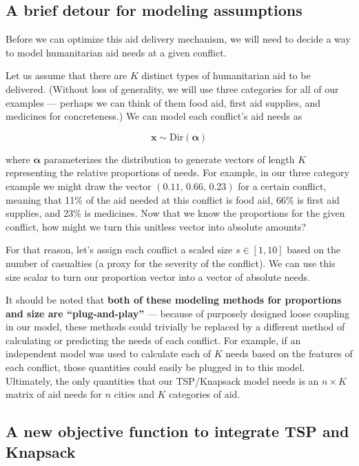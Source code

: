 \documentclass{article} %
\begin{document}
\subsection{A brief detour for modeling assumptions}

Before we can optimize this aid delivery mechanism, we will need to decide a way to model humanitarian aid needs at a given conflict.

Let us assume that there are $K$ distinct types of humanitarian aid to be delivered. (Without loss of generality, we will use three categories for all of our examples --- perhaps we can think of them food aid, first aid supplies, and medicines for concreteness.) We can model each conflict's aid needs as

$$\boldsymbol x \sim \mathrm{Dir}(\boldsymbol \alpha)$$

where $\boldsymbol \alpha$ parameterizes the distribution to generate vectors of length $K$ representing the relative proportions of needs.\cite{Murphy} For example, in our three category example we might draw the vector $(0.11,\,0.66,\,0.23)$ for a certain conflict, meaning that 11\% of the aid needed at this conflict is food aid, 66\% is first aid supplies, and 23\% is medicines. Now that we know the proportions for the given conflict, how might we turn this unitless vector into absolute amounts?

For that reason, let's assign each conflict a scaled size $s \in [1, 10]$ based on the number of casualties (a proxy for the severity of the conflict). We can use this size scalar to turn our proportion vector into a vector of absolute needs.

It should be noted that \textbf{both of these modeling methods for proportions and size are ``plug-and-play''} --- because of purposely designed loose coupling in our model, these methods could trivially be replaced by a different method of calculating or predicting the needs of each conflict. For example, if an independent model was used to calculate each of $K$ needs based on the features of each conflict, those quantities could easily be plugged in to this model. Ultimately, the only quantities that our TSP/Knapsack model needs is an $n \times K$ matrix of aid needs for $n$ cities and $K$ categories of aid.

\subsection{A new objective function to integrate TSP and Knapsack}
\end{document}
